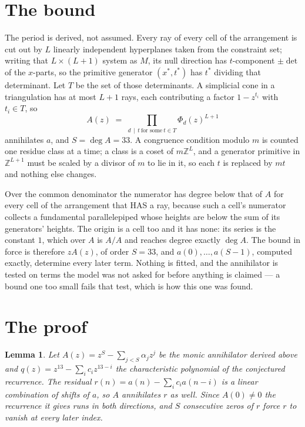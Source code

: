 \documentclass[11pt,a4paper]{article}
\theoremstyle{plain}
\newtheorem{lemma}[theorem]{Lemma}
\theoremstyle{definition}
\begin{document}
\section{The bound}

The period is derived, not assumed. Every ray of every cell of the arrangement is cut out by
$L$ linearly independent hyperplanes taken from the constraint set; writing that $L\times(L+1)$
system as $M$, its null direction has $t$-component $\pm\det$ of the $x$-parts, so the
primitive generator $(x^*,t^*)$ has $t^*$ dividing that determinant. Let $T$ be the set of
those determinants. A simplicial cone in a triangulation has at most $L+1$ rays, each
contributing a factor $1-z^{t_i}$ with $t_i\in T$, so
\[
A(z)\;=\;\prod_{d\,\mid\,t\ \text{for some}\ t\in T}\Phi_d(z)^{L+1}
\]
annihilates $a$, and $S=\deg A=33$. A congruence condition modulo $m$ is counted one residue
class at a time; a class is a coset of $m\mathbb{Z}^L$, and a generator primitive in
$\mathbb{Z}^{L+1}$ must be scaled by a divisor of $m$ to lie in it, so each $t$ is replaced
by $mt$ and nothing else changes.

Over the common denominator the numerator has degree below that of $A$ for every cell of the
arrangement that HAS a ray, because such a cell's numerator collects a fundamental
parallelepiped whose heights are below the sum of its generators' heights. The origin is a cell
too and it has none: its series is the constant $1$, which over $A$ is $A/A$ and reaches degree
exactly $\deg A$. The bound in force is therefore $zA(z)$, of order $S=33$, and
$a(0),\dots,a(S-1)$, computed exactly, determine every later term. Nothing is fitted, and the
annihilator is tested on terms the model was not asked for before anything is claimed --- a
bound one too small fails that test, which is how this one was found.

\section{The proof}

\begin{lemma}\label{lem:crit}
Let $A(z)=z^S-\sum_{j<S}\alpha_jz^{j}$ be the monic annihilator derived above and
$q(z)=z^{13}-\sum_ic_iz^{13-i}$ the characteristic polynomial of the conjectured
recurrence. The residual $r(n)=a(n)-\sum_ic_ia(n-i)$ is a linear combination of shifts of $a$,
so $A$ annihilates $r$ as well. Since $A(0)\ne0$ the recurrence it gives runs in both
directions, and $S$ consecutive zeros of $r$ force $r$ to vanish at every later index.
\end{lemma}
\end{document}

